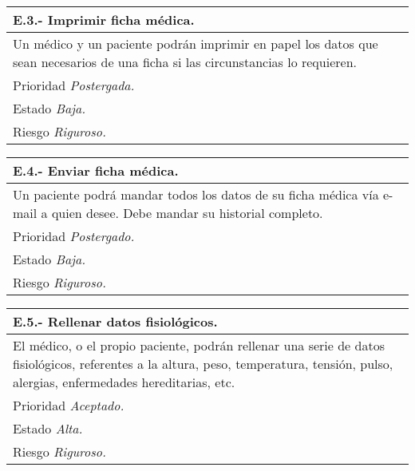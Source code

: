 	\begin{center}
	\begin{tabulary}{15cm}{|L|}
		\hline
			\bf{E.3.- Imprimir ficha médica.} \\
		\hline
			Un médico y un paciente podrán imprimir en papel los datos que sean necesarios de una ficha si las circunstancias lo requieren. \\
		\hline
			Prioridad \textit{Postergada.} \\
		\hline
			Estado \textit{Baja.} \\
		\hline
			Riesgo \textit{Riguroso.} \\
		\hline
	\end{tabulary}
	\end{center}

	\begin{center}
	\begin{tabulary}{15cm}{|L|}
		\hline
			\bf{E.4.- Enviar ficha médica.} \\
		\hline
			Un paciente podrá mandar todos los datos de su ficha médica vía e-mail a quien desee. Debe mandar su historial completo. \\
		\hline
			Prioridad \textit{Postergado.} \\
		\hline
			Estado \textit{Baja.} \\
		\hline
			Riesgo \textit{Riguroso.} \\
		\hline
	\end{tabulary}
	\end{center}

	\begin{center}
	\begin{tabulary}{15cm}{|L|}
		\hline
			\bf{E.5.- Rellenar datos fisiológicos.} \\
		\hline
			El médico, o el propio paciente, podrán rellenar una serie de datos fisiológicos, referentes a la altura, peso, temperatura, tensión, pulso, alergias, enfermedades hereditarias, etc. \\
		\hline
			Prioridad \textit{Aceptado.} \\
		\hline
			Estado \textit{Alta.} \\
		\hline
			Riesgo \textit{Riguroso.} \\
		\hline
	\end{tabulary}
	\end{center}

